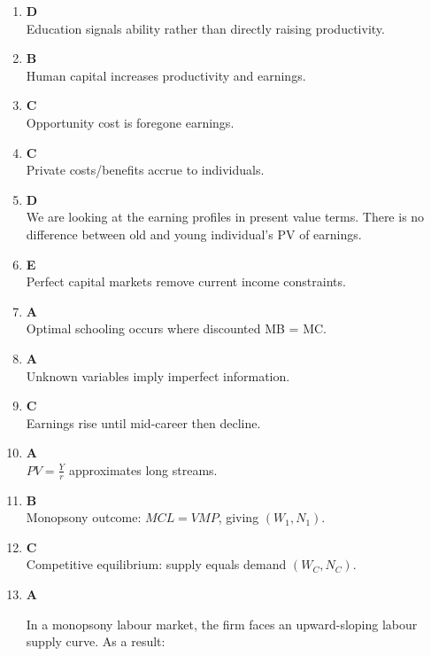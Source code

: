 \documentclass[12pt]{article}
\begin{document}
\begin{enumerate}
\item \textbf{D} \\
Education signals ability rather than directly raising productivity.

\item \textbf{B} \\
Human capital increases productivity and earnings.

\item \textbf{C} \\
Opportunity cost is foregone earnings.

\item \textbf{C} \\
Private costs/benefits accrue to individuals.

\item \textbf{D} \\
We are looking at the earning profiles in present value terms. There is no difference between old and young individual's PV of earnings.

\item \textbf{E} \\
Perfect capital markets remove current income constraints.

\item \textbf{A} \\
Optimal schooling occurs where discounted MB = MC.

\item \textbf{A} \\
Unknown variables imply imperfect information.

\item \textbf{C} \\
Earnings rise until mid-career then decline.

\item \textbf{A} \\
$PV = \frac{Y}{r}$ approximates long streams.

\item \textbf{B} \\
Monopsony outcome: $MCL = VMP$, giving $(W_1, N_1)$.

\item \textbf{C} \\
Competitive equilibrium: supply equals demand $(W_C, N_C)$.

\item \textbf{A}



In a monopsony labour market, the firm faces an upward-sloping labour supply curve. As a result:


\end{enumerate}
\end{document}
